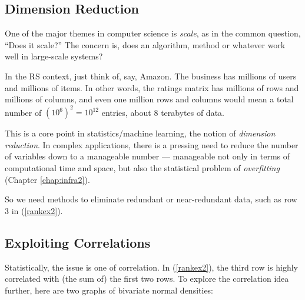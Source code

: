 \subsection{Dimension Reduction}

One of the major themes in computer science is \textit{scale}, as in the
common question, ``Does it scale?''  The concern is, does an algorithm,
method or whatever work well in large-scale systems?

In the RS context, just think of, say, Amazon.  The business has
millions of users and millions of items.  In other words, the ratings
matrix has millions of rows and millions of columns, and even one
million rows and columns would mean a total number of $(10^6)^2 =
10^{12}$ entries, about 8 terabytes of data.

This is a core point in statistics/machine learning, the notion of
\textit{dimension reduction}.  In complex applications, there is a
pressing need to reduce the number of variables down to a 
manageable number --- manageable not only in terms of computational time
and space, but also the statistical problem of \textit{overfitting}
(Chapter \ref{chap:infra2}).

So we need methods to eliminate redundant or near-redundant data, such
as row 3 in (\ref{rankex2}).

\subsection{Exploiting Correlations}
\label{explorecorr}

Statistically, the issue is one of correlation.  In (\ref{rankex2}), the
third row is highly correlated with (the sum of) the first two rows.  To
explore the correlation idea further, here are two graphs of bivariate
normal densities:

